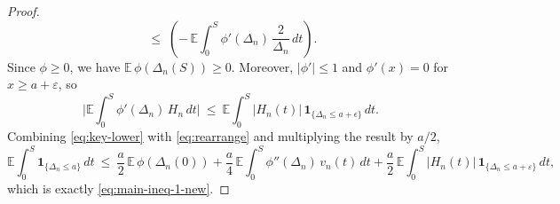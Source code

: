 \documentclass[12pt,reqno]{amsart}
\theoremstyle{plain}
\theoremstyle{definition}
\theoremstyle{remark}
\begin{document}
\begin{proof}
\begin{equation}
\;\le\;
\!\left(-\,\mathbb{E}\!\int_0^S \phi'(\Delta_n)\,\frac{2}{\Delta_n}\,dt\right).
\end{equation}
Since \(\phi\ge 0\), we have \(\mathbb{E}\,\phi(\Delta_n(S))\ge 0\). Moreover, \(|\phi'|\le 1\) and
\(\phi'(x)=0\) for \(x\ge a+\varepsilon \), so
\begin{equation}\label{eq:H-term}
\Big|\mathbb{E}\!\int_0^S \phi'(\Delta_n)\,H_n\,dt\Big|
\ \le\ \mathbb{E}\!\int_0^S |H_n(t)|\,\mathbf{1}_{\{\Delta_n\le a+\epsilon \}}\,dt .
\end{equation}
Combining \eqref{eq:key-lower} with \eqref{eq:rearrange} and multiplying the result by \(a/2\),
\begin{equation}\label{eq:254}
\mathbb{E}\!\int_0^S \mathbf{1}_{\{\Delta_n\le a\}}\,dt
\ \le\ \frac{a}{2} \,\mathbb{E}\,\phi(\Delta_n(0))
+\frac{a}{4}\,\mathbb{E}\!\int_0^S \phi''(\Delta_n)\,v_n(t)\,dt
+\frac{a}{2} \,\mathbb{E}\!\int_0^S |H_n(t)|\,\mathbf{1}_{\{\Delta_n\le a+\varepsilon \}}\,dt ,
\end{equation}
which is exactly \eqref{eq:main-ineq-1-new}.
\end{proof}
\end{document}
